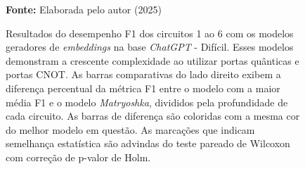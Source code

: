 \begin{figure}
\caption{Resultados do desempenho F1 dos circuitos 1 ao 6 com os modelos geradores de \textit{embeddings} na base \textit{ChatGPT} - Difícil. Esses modelos demonstram a crescente complexidade ao utilizar portas quânticas e portas CNOT. As barras comparativas do lado direito exibem a diferença percentual da métrica F1 entre o modelo com a maior média F1 e o modelo \textit{Matryoshka}, divididos pela profundidade de cada circuito. As barras de diferença são coloridas com a mesma cor do melhor modelo em questão. As marcações que indicam semelhança estatística são advindas do teste pareado de Wilcoxon com correção de p-valor de Holm.}
\label{fig:model_transformer:hard:g1}
     \centering
    \centering

      \par\medskip\ABNTEXfontereduzida\selectfont\textbf{Fonte:} Elaborada pelo autor (2025) \par\medskip
\end{figure}